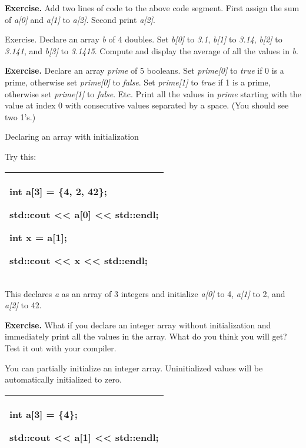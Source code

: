 \documentclass[
]{article}
\begin{document}
\textbf{Exercise.} Add two lines of code to the above code segment.
First assign the sum of \emph{a{[}0{]}} and \emph{a{[}1{]}} to
\emph{a{[}2{]}}. Second print \emph{a{[}2{]}}.

Exercise. Declare an array \emph{b} of 4 doubles. Set \emph{b{[}0{]}} to
\emph{3.1}, \emph{b{[}1{]}} to \emph{3.14}, \emph{b{[}2{]}} to
\emph{3.141}, and \emph{b{[}3{]}} to \emph{3.1415}. Compute and display
the average of all the values in \emph{b}.

\textbf{Exercise.} Declare an array \emph{prime} of 5 booleans. Set
\emph{prime{[}0{]}} to \emph{true} if 0 is a prime, otherwise set
\emph{prime{[}0{]}} to \emph{false}. Set \emph{prime{[}1{]}} to
\emph{true} if 1 is a prime, otherwise set \emph{prime{[}1{]}} to
\emph{false}. Etc. Print all the values in \emph{prime} starting with
the value at index 0 with consecutive values separated by a space. (You
should see two 1's.)

Declaring an array with initialization

Try this:

\begin{longtable}[]{@{}l@{}}
\toprule
\endhead
\begin{minipage}[t]{0.97\columnwidth}\raggedright
int a{[}3{]} = \{4, 2, 42\};

std::cout \textless\textless{} a{[}0{]} \textless\textless{} std::endl;

int x = a{[}1{]};

std::cout \textless\textless{} x \textless\textless{} std::endl; \strut
\end{minipage}\tabularnewline
\bottomrule
\end{longtable}

This declares \emph{a} as an array of 3 integers and initialize
\emph{a{[}0{]}} to 4, \emph{a{[}1{]}} to 2, and \emph{a{[}2{]}} to 42.

\textbf{Exercise.} What if you declare an integer array without
initialization and immediately print all the values in the array. What
do you think you will get? Test it out with your compiler.

You can partially initialize an integer array. Uninitialized values will
be automatically initialized to zero.

\begin{longtable}[]{@{}l@{}}
\toprule
\endhead
\begin{minipage}[t]{0.97\columnwidth}\raggedright
int a{[}3{]} = \{4\};

std::cout \textless\textless{} a{[}1{]} \textless\textless{} std::endl;
\strut
\end{minipage}\tabularnewline
\bottomrule
\end{longtable}
\end{document}
